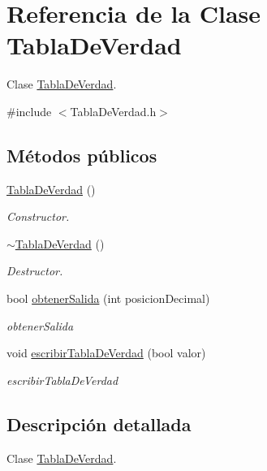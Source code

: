 \hypertarget{classTablaDeVerdad}{\section{Referencia de la Clase Tabla\-De\-Verdad}
\label{classTablaDeVerdad}
}


Clase \hyperlink{classTablaDeVerdad}{Tabla\-De\-Verdad}.  




{\ttfamily \#include $<$Tabla\-De\-Verdad.\-h$>$}

\subsection*{Métodos públicos}
\begin{DoxyCompactItemize}
\item 
\hyperlink{classTablaDeVerdad_a69d50b7f18461c771ceb15b14a660122}{Tabla\-De\-Verdad} ()
\begin{DoxyCompactList}\small\item\em Constructor. \end{DoxyCompactList}\item 
\hyperlink{classTablaDeVerdad_ac41dd0d65d191b0a34b369b8a4d2439d}{$\sim$\-Tabla\-De\-Verdad} ()
\begin{DoxyCompactList}\small\item\em Destructor. \end{DoxyCompactList}\item 
bool \hyperlink{classTablaDeVerdad_a3e53eabc4e37d9514141f4afacc1e915}{obtener\-Salida} (int posicion\-Decimal)
\begin{DoxyCompactList}\small\item\em obtener\-Salida \end{DoxyCompactList}\item 
void \hyperlink{classTablaDeVerdad_add681181eba54bcb2f1153c6f886a793}{escribir\-Tabla\-De\-Verdad} (bool valor)
\begin{DoxyCompactList}\small\item\em escribir\-Tabla\-De\-Verdad \end{DoxyCompactList}\end{DoxyCompactItemize}


\subsection{Descripción detallada}
Clase \hyperlink{classTablaDeVerdad}{Tabla\-De\-Verdad}. 


